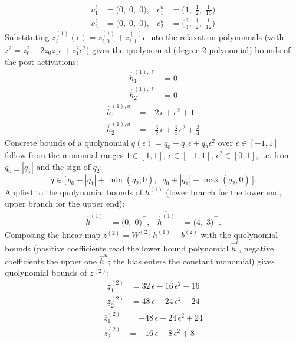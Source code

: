 \documentclass[11pt]{article}
\begin{document}
\begin{align*}
c^{\ell}_{1} &= \bigl(0,\; 0,\; 0\bigr), & c^{u}_{1} &= \bigl(1,\; \frac{1}{2},\; \frac{1}{16}\bigr) \\
c^{\ell}_{2} &= \bigl(0,\; 0,\; 0\bigr), & c^{u}_{2} &= \bigl(\frac{3}{4},\; \frac{1}{2},\; \frac{1}{12}\bigr)
\end{align*}
Substituting $z^{(1)}_i(\epsilon) = z^{(1)}_{i,0} + z^{(1)}_{i,1} \epsilon$ into the relaxation
polynomials (with $z^2 = z_0^2 + 2 z_0 z_1 \epsilon + z_1^2 \epsilon^2$) gives the quolynomial
(degree-2 polynomial) bounds of the post-activations:
\begin{align*}
\hat{h}^{(1),\ell}_{1} &= 0 \\
\hat{h}^{(1),\ell}_{2} &= 0
\end{align*}
\begin{align*}
\hat{h}^{(1),u}_{1} &= -2\,\epsilon + \epsilon^2 + 1 \\
\hat{h}^{(1),u}_{2} &= -\frac{3}{2}\,\epsilon + \frac{3}{4}\,\epsilon^2 + \frac{3}{4}
\end{align*}
Concrete bounds of a quolynomial $q(\epsilon) = q_0 + q_1 \epsilon + q_2 \epsilon^2$ over
$\epsilon \in [-1, 1]$ follow from the monomial ranges $1 \in [1, 1]$, $\epsilon \in [-1, 1]$,
$\epsilon^2 \in [0, 1]$, i.e. from $q_0 \pm |q_1|$ and the sign of $q_2$:
\begin{equation*}
q \in \bigl[\, q_0 - |q_1| + \min(q_2, 0), \;\; q_0 + |q_1| + \max(q_2, 0) \,\bigr].
\end{equation*}
Applied to the quolynomial bounds of $h^{(1)}$ (lower branch for the lower end, upper branch for the upper end):
\begin{align*}
\underline{\hat{h}^{(1)}} &= \bigl(0,\; 0\bigr)^{\!\top}, & \overline{\hat{h}^{(1)}} &= \bigl(4,\; 3\bigr)^{\!\top}.
\end{align*}
Composing the linear map $z^{(2)} = W^{(2)} h^{(1)} + b^{(2)}$ with the quolynomial bounds
(positive coefficients read the lower bound polynomial $\hat{h}^{\ell}$, negative coefficients the
upper one $\hat{h}^{u}$; the bias enters the constant monomial) gives quolynomial bounds of
$z^{(2)}$:
\begin{align*}
\underline{z}^{(2)}_{1} &= 32\,\epsilon - 16\,\epsilon^2 - 16 \\
\underline{z}^{(2)}_{2} &= 48\,\epsilon - 24\,\epsilon^2 - 24
\end{align*}
\begin{align*}
\overline{z}^{(2)}_{1} &= -48\,\epsilon + 24\,\epsilon^2 + 24 \\
\overline{z}^{(2)}_{2} &= -16\,\epsilon + 8\,\epsilon^2 + 8
\end{align*}
\end{document}
